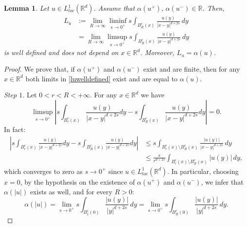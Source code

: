 \documentclass[reqno,11pt]{amsart}
\numberwithin{equation}{section}
\theoremstyle{definition} %
\theoremstyle{plain}
\newtheorem{lemma}[lemma]{Lemma}
\theoremstyle{definition}
\theoremstyle{remark}
\def\R{\mathbb{R}}
\newcommand{\abs}[1]{\left|#1\right|}
\begin{document}
\begin{lemma}
    \label{lemma:lualphau}
    Let $u\in L^1_{loc}(\R^d)$. Assume that $\alpha(u^+),\,\alpha(u^-)\in \R$. Then,
    \begin{equation}
        \label{luwelldefined}
        \begin{split}
             L_u&:=\lim_{R\to\infty}\liminf_{s\to 0^+}s\int_{B_R^c(x)}\frac{u(y)}{\abs{x-y}^{d+2s}}\,dy\\
             &=\lim_{R\to\infty}\limsup_{s\to 0^+}s\int_{B_R^c(x)}\frac{u(y)}{\abs{x-y}^{d+2s}}\,dy
        \end{split}
    \end{equation}
    is well defined and does not depend on $x\in\R^d$. Moreover, $L_u=\alpha(u)$.
\end{lemma}
\begin{proof}
    We prove that, if $\alpha(u^+)$ and $\alpha(u^-)$ exist and are finite, then for any $x\in\R^d$ both limits in \ref{luwelldefined} exist and are equal to $\alpha(u)$.\par
    \textit{Step $1$.} Let $0<r<R<+\infty$. For any $x\in \R^d$ we have
    \begin{equation*}
        \limsup_{s\to 0^+} \left|s\int_{B_r^c(x)}\frac{u(y)}{\abs{x-y}^{d+2s}}dy-s\int_{B_R^c(x)}\frac{u(y)}{\abs{x-y}^{d+2s}}dy\right|=0.
    \end{equation*}
    In fact:
    \begin{equation*}
        \begin{split}
            \left|s\int_{B_r^c(x)}\frac{u(y)}{\abs{x-y}^{d+2s}}dy-s\int_{B_R^c(x)}\frac{u(y)}{\abs{x-y}^{d+2s}}dy\right|&\leq s\int_{B_r^c(x)\setminus B_R^c(x)}\frac{\abs{u(y)}}{\abs{x-y}^{d+2s}}\,dy\\
            &\leq \frac{s}{r^{d+2s}}\int_{B_r^c(x)\setminus B_R^c(x)}\abs{u(y)}\,dy,
        \end{split}
    \end{equation*}
    which converges to zero as $s\to0^+$ since $u\in L^1_{loc}(\R^d)$. In particular, choosing $x=0$, by the hypothesis on the existence of $\alpha(u^+)$ and $\alpha(u^-)$, we infer that $\alpha(|u|)$ exists as well, and for every $R>0$:
    \begin{equation}
        \label{Eq:alpha1R}
        \alpha(|u|)=\lim_{s\to0^+}{s}\int_{B_1^c(0)}\frac{|u(y)|}{\abs{y}^{d+2s}}\,dy
        =
        \lim_{s\to0^+}{s}\int_{B_R^c(0)}\frac{|u(y)|}{\abs{y}^{d+2s}}\,dy.
    \end{equation}
    

\end{proof}
\end{document}
